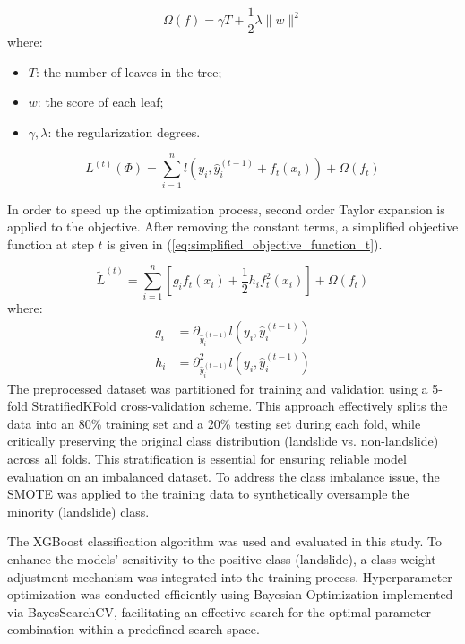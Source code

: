 \begin{equation} \label{eq:regularization_term}
\Omega(f) = \gamma T + \frac{1}{2} \lambda \|w\|^2
\end{equation}
where:
\begin{itemize}
    \item $T$: the number of leaves in the tree;
    \item $w$: the score of each leaf;
    \item $\gamma, \lambda$: the regularization degrees.
\end{itemize}

\begin{equation} \label{eq:objective_function_t}
L^{(t)}(\Phi) = \sum_{i=1}^n l(y_i, \hat{y}_i^{(t-1)} + f_t(x_i)) + \Omega(f_t)
\end{equation}

In order to speed up the optimization process, second order Taylor expansion is applied to the objective. After removing the constant terms, a simplified objective function at step $t$ is given in (\ref{eq:simplified_objective_function_t}).

\begin{equation} \label{eq:simplified_objective_function_t}
\tilde{L}^{(t)} = \sum_{i=1}^n \left[ g_i f_t(x_i) + \frac{1}{2} h_i f_t^2(x_i) \right] + \Omega(f_t)
\end{equation}
where:
\begin{align} \label{eq:g_h_definitions}
g_i &= \partial_{\hat{y}_i^{(t-1)}} l(y_i, \hat{y}_i^{(t-1)}) \\
h_i &= \partial_{\hat{y}_i^{(t-1)}}^2 l(y_i, \hat{y}_i^{(t-1)})
\end{align}
The preprocessed dataset was partitioned for training and validation using a 5-fold StratifiedKFold cross-validation scheme\cite{mthd06}. This approach effectively splits the data into an 80\% training set and a 20\% testing set during each fold, while critically preserving the original class distribution (landslide vs. non-landslide) across all folds. This stratification is essential for ensuring reliable model evaluation on an imbalanced dataset. To address the class imbalance issue, the SMOTE was applied to the training data to synthetically oversample the minority (landslide) class\cite{mthd07}.

The XGBoost classification algorithm was used and evaluated in this study. To enhance the models' sensitivity to the positive class (landslide), a class weight adjustment mechanism was integrated into the training process. Hyperparameter optimization was conducted efficiently using Bayesian Optimization implemented via BayesSearchCV\cite{mthd08}, facilitating an effective search for the optimal parameter combination within a predefined search space.


